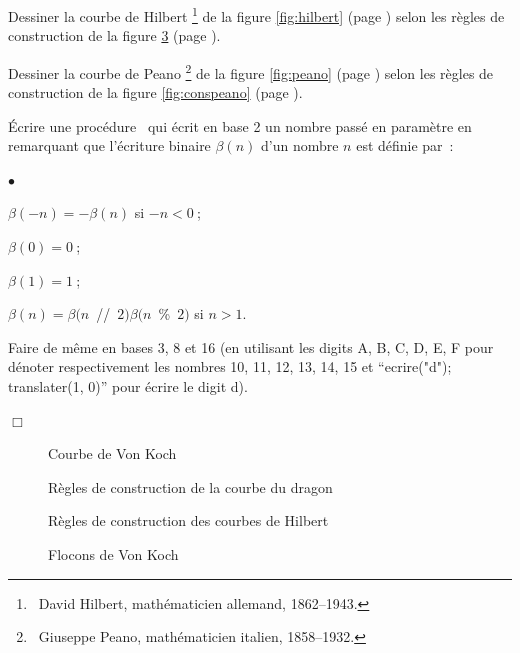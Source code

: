 \begin{exercice}
{\tiret Dessiner la courbe de Hilbert\/%
\footnote{\ David Hilbert, mathématicien allemand, 1862--1943.}
de la figure \ref{fig:hilbert}  (page \pageref{fig:hilbert}) selon les règles de construction de
la figure \ref{fig:conshilbert}  (page \pageref{fig:conshilbert}).

\tiret Dessiner la courbe de Peano\/%
\footnote{\ Giuseppe Peano, mathématicien italien, 1858--1932.}
 de la figure \ref{fig:peano}  (page \pageref{fig:peano}) selon les règles de construction de
la figure \ref{fig:conspeano}  (page \pageref{fig:conspeano}).

\tiret Écrire une procédure \python\ qui écrit en base 2 un nombre passé en paramètre
en remarquant que l'écriture binaire $\beta(n)$ d'un nombre $n$ est définie par~:
\begin{list}{$\scriptscriptstyle\bullet$}{
}
  \item $\beta(-n) = -\beta(n)$ si $-n < 0$$\:$;
  \item $\beta(0) = 0$$\:$;
 \item $\beta(1) = 1$$\:$;
 \item $\beta(n) = \beta(n $\ {\idt //}\ $ 2) \beta(n$\ {\idt \%}\ $2)$ si $n > 1$.
\end{list}
Faire de même en bases 3, 8 et 16 (en utilisant les digits {\idt A}, {\idt B}, {\idt C}, {\idt D},
{\idt E}, {\idt F} pour dénoter respectivement les nombres 10, 11, 12, 13, 14, 15 et 
``{\idt ecrire(}{\cha "d"}{\idt ); translater(1, 0)}'' 
pour écrire le digit \mbox{\cha d}).

\noindent $\Box$}\end{exercice}
\begin{figure}[htbp]
 \caption{Courbe de Von Koch}\label{fig:segvonkoch}
\end{figure}
\begin{figure}[htbp]
 \caption{Règles de construction de la courbe du dragon}\label{fig:consdragon}
\end{figure}
\begin{figure}[htbp]
 \caption{Règles de construction des courbes de Hilbert}\label{fig:conshilbert}
\end{figure}
\begin{figure}[htbp]
 \caption{Flocons de Von Koch}\label{fig:flocvonkoch}
\end{figure}
